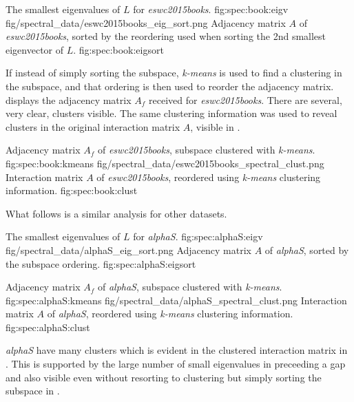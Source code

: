 {The smallest eigenvalues of $L$ for \textit{eswc2015books}.}
{fig:spec:book:eigv}
{fig/spectral_data/eswc2015books_eig_sort.png}
{Adjacency matrix $A$ of \textit{eswc2015books}, sorted by the reordering used when sorting the 2nd smallest eigenvector of $L$.}
{fig:spec:book:eigsort}

\FloatBarrier

If instead of simply sorting the subspace, \textit{k-means} is used to find a clustering in the subspace, and that ordering is then used to reorder the adjacency matrix.  displays the adjacency matrix $A_f$ received for \textit{eswc2015books}. There are several, very clear, clusters visible. The same clustering information was used to reveal clusters in
the original interaction matrix $A$, visible in .

\FloatBarrier

{Adjacency matrix $A_f$ of \textit{eswc2015books}, subspace clustered with \textit{k-means}.}
{fig:spec:book:kmeans}
{fig/spectral_data/eswc2015books_spectral_clust.png}
{Interaction matrix $A$ of \textit{eswc2015books}, reordered using \textit{k-means} clustering information.}
{fig:spec:book:clust}

\FloatBarrier

What follows is a similar analysis for other datasets.

\FloatBarrier

{The smallest eigenvalues of $L$ for \textit{alphaS}.}
{fig:spec:alphaS:eigv}
{fig/spectral_data/alphaS_eig_sort.png}
{Adjacency matrix $A$ of \textit{alphaS}, sorted by the subspace ordering.}
{fig:spec:alphaS:eigsort}

{Adjacency matrix $A_f$ of \textit{alphaS}, subspace clustered with \textit{k-means}.}
{fig:spec:alphaS:kmeans}
{fig/spectral_data/alphaS_spectral_clust.png}
{Interaction matrix $A$ of \textit{alphaS}, reordered using \textit{k-means} clustering information.}
{fig:spec:alphaS:clust}

\FloatBarrier

\textit{alphaS} have many clusters which is evident in the clustered interaction matrix in . This is supported by the large number of small eigenvalues in  preceeding a gap and also visible even without resorting to clustering but simply sorting the subspace in .

